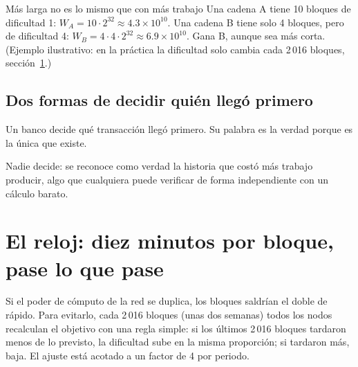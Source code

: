 \documentclass[11pt,a4paper]{article}
\newcommand{\webhint}[1]{}
\begin{document}
\begin{ejemplo}{Más larga no es lo mismo que con más trabajo}\label{ej:trabajo}
Una cadena A tiene 10 bloques de dificultad 1: $W_A=10\cdot 2^{32}\approx 4.3\times 10^{10}$. Una cadena B tiene solo 4 bloques, pero de dificultad 4: $W_B=4\cdot 4\cdot 2^{32}\approx 6.9\times10^{10}$. Gana B, aunque sea más corta. (Ejemplo ilustrativo: en la práctica la dificultad solo cambia cada 2\,016 bloques, sección~\ref{sec:reloj}.)
\end{ejemplo}

\subsection{Dos formas de decidir quién llegó primero}

\begin{minipage}[t]{0.485\linewidth}
\begin{tcolorbox}[pbbox,colback=pbgray!6,colframe=pbgray,title={Con un tercero de confianza}]
Un banco decide qué transacción llegó primero. Su palabra es la verdad porque es la única que existe.
\end{tcolorbox}
\end{minipage}\hfill
\begin{minipage}[t]{0.485\linewidth}
\begin{tcolorbox}[pbbox,colback=pborange!7,colframe=pborange,title={Con prueba de trabajo}]
Nadie decide: se reconoce como verdad la historia que costó más trabajo producir, algo que cualquiera puede verificar de forma independiente con un cálculo barato.
\end{tcolorbox}
\end{minipage}

\section{El reloj: diez minutos por bloque, pase lo que pase}\label{sec:reloj}
\webhint{section; id=sec-reloj; slug=ajuste-de-dificultad; kicker=08 — el reloj; role=narrative+widget}

Si el poder de cómputo de la red se duplica, los bloques saldrían el doble de rápido. Para evitarlo, cada 2\,016 bloques (unas dos semanas) todos los nodos recalculan el objetivo con una regla simple: si los últimos 2\,016 bloques tardaron menos de lo previsto, la dificultad sube en la misma proporción; si tardaron más, baja. El ajuste está acotado a un factor de 4 por periodo.
\end{document}
